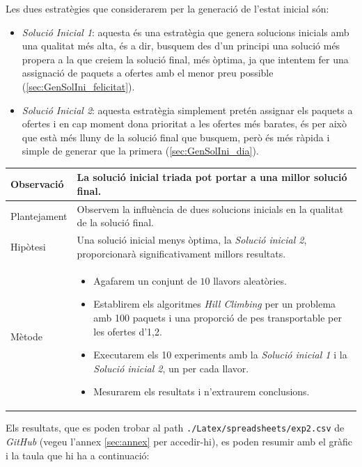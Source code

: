 \documentclass[a4paper]{article}
\begin{document}
	Les dues estratègies que considerarem per la generació de l'estat inicial són:
	
	\begin{itemize}
		\item \emph{Solució Inicial 1}: aquesta és una estratègia que genera solucions inicials amb una qualitat més alta, és a dir, busquem des d'un principi una solució més propera a la que creiem la solució final, més òptima, ja que intentem fer una assignació de paquets a ofertes amb el menor preu possible (\ref{sec:GenSolIni_felicitat}).
		
		\item \emph{Solució Inicial 2}: aquesta estratègia simplement pretén assignar els paquets a ofertes i en cap moment dona prioritat a les ofertes més barates, és per això que està més lluny de la solució final que busquem, però és més ràpida i simple de generar que la primera (\ref{sec:GenSolIni_dia}).
	\end{itemize}
	
	\begin{table}[ht]
		\centering
		\begin{tabular}{|l|p{10cm}|}
			\hline
			Observació & La solució inicial triada pot portar a una millor solució final. \\
			\hline
			Plantejament & Observem la influència de dues solucions inicials en la qualitat de la solució final. \\
			\hline
			Hipòtesi & Una solució inicial menys òptima, la \textit{Solució inicial 2}, proporcionarà significativament millors resultats.\\
			\hline
			Mètode & 
			\begin{itemize}
				\item Agafarem un conjunt de $10$ llavors aleatòries.
				\item Establirem els algoritmes \textit{Hill Climbing} per un problema amb 100 paquets i una proporció de pes transportable per les ofertes d'1,2.
				\item Executarem els 10 experiments amb la \textit{Solució inicial 1} i la \textit{Solució inicial 2}, un per cada llavor.
				\item Mesurarem els resultats i n'extraurem conclusions.
			\end{itemize} \\
			\hline
		\end{tabular}
		\label{tab:exp2_apartats}
	\end{table}
	
	Els resultats, que es poden trobar al path \texttt{./Latex/spreadsheets/exp2.csv} de \textit{GitHub} (vegeu l'annex \ref{sec:annex} per accedir-hi), es poden resumir amb el gràfic i la taula que hi ha a continuació:
	
\end{document}

